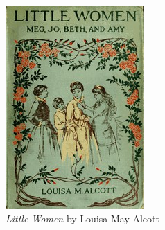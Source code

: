 \begin{figure}[t]
    \centering
    \caption{\textit{Little Women} by Louisa May Alcott}
    \label{fig:little women cover}
    \includegraphics[width=0.25\columnwidth]{figures/pngs/little women cover.jpg}
\end{figure}
